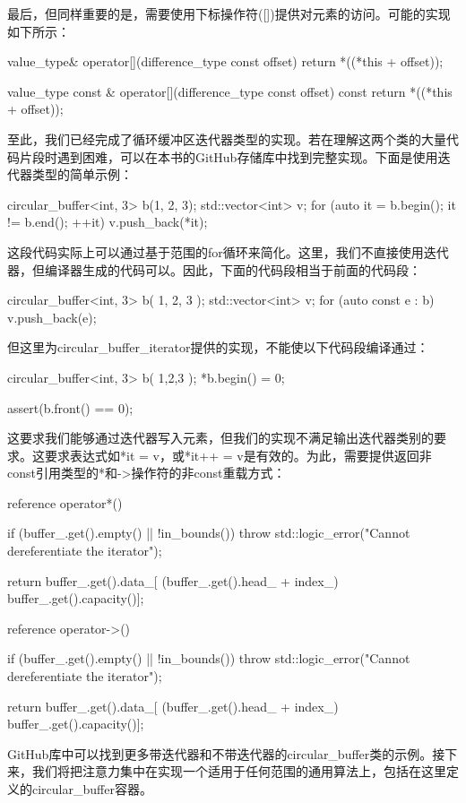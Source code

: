 最后，但同样重要的是，需要使用下标操作符([])提供对元素的访问。可能的实现如下所示：

\begin{cppcode}
value_type& operator[](difference_type const offset)
{
	return *((*this + offset));
}

value_type const & operator[](difference_type const offset)
const
{
	return *((*this + offset));
}
\end{cppcode}

至此，我们已经完成了循环缓冲区迭代器类型的实现。若在理解这两个类的大量代码片段时遇到困难，可以在本书的GitHub存储库中找到完整实现。下面是使用迭代器类型的简单示例：

\begin{cppcode}
circular_buffer<int, 3> b({1, 2, 3});
std::vector<int> v;
for (auto it = b.begin(); it != b.end(); ++it)
{
	v.push_back(*it);
}
\end{cppcode}

这段代码实际上可以通过基于范围的for循环来简化。这里，我们不直接使用迭代器，但编译器生成的代码可以。因此，下面的代码段相当于前面的代码段：

\begin{cppcode}
circular_buffer<int, 3> b({ 1, 2, 3 });
std::vector<int> v;
for (auto const e : b)
{
	v.push_back(e);
}
\end{cppcode}

但这里为circular_buffer_iterator提供的实现，不能使以下代码段编译通过：

\begin{cppcode}
circular_buffer<int, 3> b({ 1,2,3 });
*b.begin() = 0;

assert(b.front() == 0);
\end{cppcode}

这要求我们能够通过迭代器写入元素，但我们的实现不满足输出迭代器类别的要求。这要求表达式如*it = v，或*it++ = v是有效的。为此，需要提供返回非const引用类型的*和->操作符的非const重载方式：

\begin{cppcode}
reference operator*()
{
	if (buffer_.get().empty() || !in_bounds())
		throw std::logic_error("Cannot dereferentiate the
								iterator");
	
	return buffer_.get().data_[
		(buffer_.get().head_ + index_) %
		 buffer_.get().capacity()];
}

reference operator->()
{
	if (buffer_.get().empty() || !in_bounds())
		throw std::logic_error("Cannot dereferentiate the
								iterator");
								
	return buffer_.get().data_[
		(buffer_.get().head_ + index_) %
		 buffer_.get().capacity()];
}
\end{cppcode}

GitHub库中可以找到更多带迭代器和不带迭代器的circular_buffer类的示例。接下来，我们将把注意力集中在实现一个适用于任何范围的通用算法上，包括在这里定义的circular_buffer容器。






















